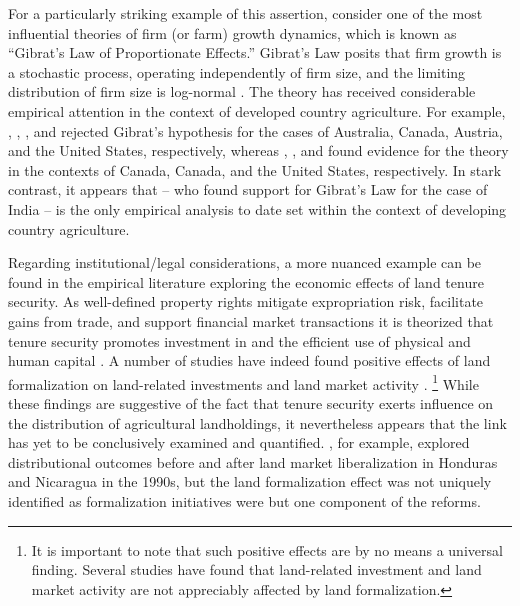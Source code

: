 \documentclass[english]{article}
\begin{document}
For a particularly striking example of this assertion, consider one of the 
most influential theories of firm (or farm) growth dynamics, which is known 
as ``Gibrat's Law of Proportionate Effects.''
Gibrat's Law posits that firm growth is a stochastic process, operating 
independently of firm size, and the limiting distribution of firm size is 
log-normal \citep{gibrat1931, sutton1997}.
The theory has received considerable empirical attention in the context
of developed country agriculture.
For example, \citet{jarrett1968}, \citet{shapiro1987}, \citet{weiss1999}, 
and \citet{melhim2009a} rejected Gibrat's hypothesis for the cases of Australia, 
Canada, Austria, and the United States, respectively, whereas \citet{clark1992}, \citet{fulton1995}, and \citet{melhim2009b} found evidence for the  
theory in the contexts of Canada, Canada, and the United States, respectively.  
In stark contrast, it appears that \citet{shergill1991} -- who found support for 
Gibrat's Law for the case of India -- is the only empirical analysis to date set 
within the context of developing country agriculture.

Regarding institutional/legal considerations, a more nuanced example can be 
found in the empirical literature exploring the economic effects of land 
tenure security.
As well-defined property rights mitigate expropriation risk, facilitate gains 
from trade, and support financial market transactions it is theorized that
tenure security promotes investment in and the efficient use of physical 
and human capital \citep{besley2010}.
A number of studies have indeed found positive effects of land formalization 
on land-related investments \citep{feder1988, besley1995, deininger2008} and 
land market activity \citep{deininger2003, boucher2005, deininger2008b}.%
\footnote{It is important to note that such positive effects are by no means
a universal finding. 
Several studies have found that land-related investment \citep{migot1991, 
gavian1996, brasselle2002} and land market activity \citep{deininger2005, 
gould2006, barnes2007} are not appreciably affected by land formalization.}
While these findings are suggestive of the fact that tenure security exerts 
influence on the distribution of agricultural landholdings, it nevertheless 
appears that the link has yet to be conclusively examined and quantified.
\citet{boucher2005}, for example, explored distributional outcomes before 
and after land market liberalization in Honduras and Nicaragua in the 1990s, 
but the land formalization effect was not uniquely identified as formalization 
initiatives were but one component of the reforms.
\end{document}
